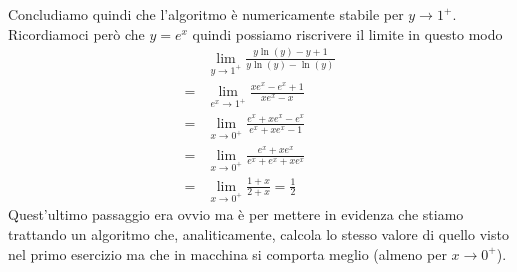 \begin{example}
	Concludiamo quindi che l'algoritmo è numericamente stabile per $y \to 1^+$. Ricordiamoci però che $y = e^x$
	quindi possiamo riscrivere il limite in questo modo
	\begin{align*}
		  & \lim_{y \to 1^+} \frac{y \ln (y) - y + 1}{y \ln(y) - \ln (y)} \\
		= & \lim_{e^x \to 1^+} \frac{x e^x - e^x + 1}{x e^x - x}          \\
		= & \lim_{x \to 0^+} \frac{e^x + x e^x - e^x}{e^x + x e^x - 1}    \\
		= & \lim_{x \to 0^+} \frac{e^x + x e^x}{e^x + e^x + x e^x}        \\
		= & \lim_{x \to 0^+} \frac{1 + x}{2 + x} = \frac{1}{2}
	\end{align*}
	Quest'ultimo passaggio era ovvio ma è per mettere in evidenza che stiamo trattando un algoritmo che,
	analiticamente, calcola lo stesso valore di quello visto nel primo esercizio ma che in macchina si comporta
	meglio (almeno per $x \to 0^+$).
\end{example}